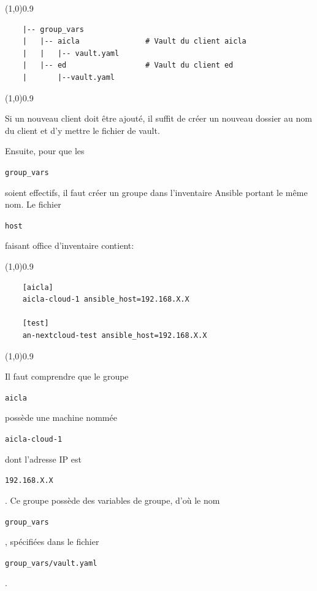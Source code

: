 \documentclass[12pt, a4paper, twoside]{article}
\begin{document}
\vspace{-1ex}
\begin{code}
\vspace{-1ex}
\begin{center} 
    \line(1,0){0.9\textwidth} 
\end{center}
\vspace{-1ex}
\begin{verbatim}
    |-- group_vars
    |   |-- aicla               # Vault du client aicla
    |   |   |-- vault.yaml
    |   |-- ed                  # Vault du client ed
    |       |--vault.yaml
\end{verbatim}
\vspace{-1ex}
\begin{center} 
    \line(1,0){0.9\textwidth} 
\end{center}
\vspace{-1ex}
\end{code}

Si un nouveau client doit être ajouté, il suffit de créer un nouveau dossier au nom du client et d'y mettre le fichier de vault.

Ensuite, pour que les \begin{code}\texttt{group\_vars}\end{code} soient effectifs, il faut créer un groupe dans l'inventaire \gls{Ansible} portant le même nom. 
Le fichier \begin{code}\texttt{host}\end{code} faisant office d'inventaire contient:
\vspace{-1ex}
\begin{code}
\vspace{-1ex}
\begin{center} 
    \line(1,0){0.9\textwidth} 
\end{center}
\vspace{-1ex}
\begin{verbatim}
    [aicla]
    aicla-cloud-1 ansible_host=192.168.X.X
    
    [test]
    an-nextcloud-test ansible_host=192.168.X.X
\end{verbatim}
\vspace{-1ex}
\begin{center} 
    \line(1,0){0.9\textwidth} 
\end{center}
\vspace{-1ex}
\end{code}


Il faut comprendre que le groupe \begin{code}\texttt{aicla}\end{code} possède une machine nommée \begin{code}\texttt{aicla-cloud-1}\end{code} dont l'adresse \gls{IP} est \begin{code}\texttt{192.168.X.X}\end{code}. 
Ce groupe possède des variables de groupe, d'où le nom \begin{code}\texttt{group\_vars}\end{code}, spécifiées dans le fichier \begin{code}\texttt{group\_vars/vault.yaml}\end{code}.
\end{document}
